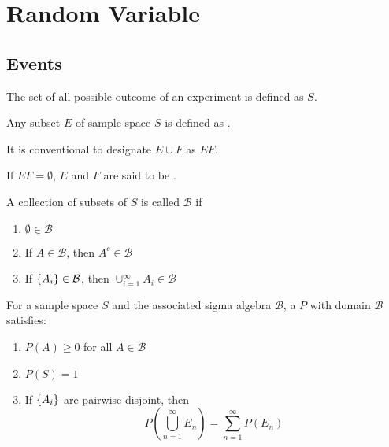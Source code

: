 \chapter{Random Variable}

\section{Events}

\begin{definition}
    The set of all possible outcome of an experiment is defined as  $S$.
\end{definition}

\begin{definition}[event]
    Any subset $E$ of sample space $S$ is defined as .
\end{definition}

It is conventional to designate $E \cup F$ as $EF$.


\begin{definition}
    If $EF = \emptyset $, $E$ and $F$ are said to be .
\end{definition}


\begin{definition}
    A collection of subsets of $S$ is called  $\mathcal{B}$ if
    \begin{enumerate}
        \item $\emptyset \in \mathcal{B}$
        \item If $A \in \mathcal{B}$, then $A^c \in \mathcal{B}$
        \item If $\set{A_i} \in \mathcal{B}$, then $\cup_{i=1}^\infty A_i \in \mathcal{B}$
    \end{enumerate}
\end{definition}


\begin{definition}
    For a sample space $S$ and the associated sigma algebra $\mathcal{B}$, a  $P$ with domain $\mathcal{B}$ satisfies:
    \begin{enumerate}
        \item $P(A) \geq 0$ for all $A \in \mathcal{B}$
        \item $P(S) = 1$
        \item If $\set{A_i}$ are pairwise disjoint, then        
            \begin{equation}
                P \left(\bigcup_{n=1}^\infty E_n \right) = \sum_{n=1}^\infty P(E_n)
            \end{equation}
    \end{enumerate}
\end{definition}


